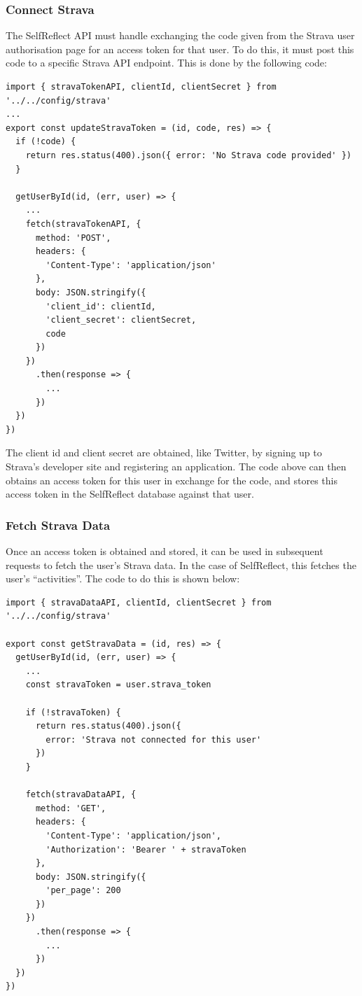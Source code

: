 \documentclass[11pt,openright,a4paper]{report}
\begin{document}
\subsubsection{Connect Strava}
The SelfReflect API must handle exchanging the code given from the Strava user authorisation page for an access token for that user. To do this, it must post this code to a specific Strava API endpoint. This is done by the following code:
\begin{lstlisting}
import { stravaTokenAPI, clientId, clientSecret } from '../../config/strava'
...
export const updateStravaToken = (id, code, res) => {
  if (!code) {
    return res.status(400).json({ error: 'No Strava code provided' })
  }

  getUserById(id, (err, user) => {
    ...
    fetch(stravaTokenAPI, {
      method: 'POST',
      headers: {
        'Content-Type': 'application/json'
      },
      body: JSON.stringify({
        'client_id': clientId,
        'client_secret': clientSecret,
        code
      })
    })
      .then(response => {
        ...
      })
  })
})
\end{lstlisting}
The client id and client secret are obtained, like Twitter, by signing up to Strava's developer site and registering an application. The code above can then obtains an access token for this user in exchange for the code, and stores this access token in the SelfReflect database against that user.

\subsubsection{Fetch Strava Data}
Once an access token is obtained and stored, it can be used in subsequent requests to fetch the user's Strava data. In the case of SelfReflect, this fetches the user's \enquote{activities}. The code to do this is shown below:
\begin{lstlisting}
import { stravaDataAPI, clientId, clientSecret } from '../../config/strava'

export const getStravaData = (id, res) => {
  getUserById(id, (err, user) => {
    ...
    const stravaToken = user.strava_token

    if (!stravaToken) {
      return res.status(400).json({
        error: 'Strava not connected for this user'
      })
    }

    fetch(stravaDataAPI, {
      method: 'GET',
      headers: {
        'Content-Type': 'application/json',
        'Authorization': 'Bearer ' + stravaToken
      },
      body: JSON.stringify({
        'per_page': 200
      })
    })
      .then(response => {
        ...
      })
  })
})
\end{lstlisting}
\end{document}
